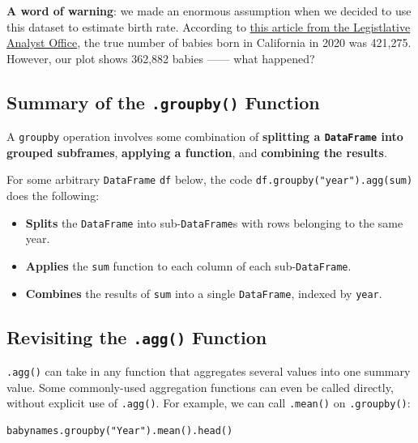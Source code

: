 \documentclass[
  letterpaper,
  DIV=11,
  numbers=noendperiod]{scrreprt}
\providecommand{\tightlist}{%
  \setlength{\itemsep}{0pt}\setlength{\parskip}{0pt}}\usepackage{longtable,booktabs,array}
\begin{document}
\textbf{A word of warning}: we made an enormous assumption when we
decided to use this dataset to estimate birth rate. According to
\href{https://lao.ca.gov/LAOEconTax/Article/Detail/691}{this article
from the Legistlative Analyst Office}, the true number of babies born in
California in 2020 was 421,275. However, our plot shows 362,882 babies
------ what happened?

\subsection{\texorpdfstring{Summary of the \texttt{.groupby()}
Function}{Summary of the .groupby() Function}}\label{summary-of-the-.groupby-function}

A \texttt{groupby} operation involves some combination of
\textbf{splitting a \texttt{DataFrame} into grouped subframes},
\textbf{applying a function}, and \textbf{combining the results}.

For some arbitrary \texttt{DataFrame} \texttt{df} below, the code
\texttt{df.groupby("year").agg(sum)} does the following:

\begin{itemize}
\tightlist
\item
  \textbf{Splits} the \texttt{DataFrame} into sub-\texttt{DataFrame}s
  with rows belonging to the same year.
\item
  \textbf{Applies} the \texttt{sum} function to each column of each
  sub-\texttt{DataFrame}.
\item
  \textbf{Combines} the results of \texttt{sum} into a single
  \texttt{DataFrame}, indexed by \texttt{year}.
\end{itemize}

\subsection{\texorpdfstring{Revisiting the \texttt{.agg()}
Function}{Revisiting the .agg() Function}}\label{revisiting-the-.agg-function}

\texttt{.agg()} can take in any function that aggregates several values
into one summary value. Some commonly-used aggregation functions can
even be called directly, without explicit use of \texttt{.agg()}. For
example, we can call \texttt{.mean()} on \texttt{.groupby()}:

\begin{verbatim}
babynames.groupby("Year").mean().head()
\end{verbatim}
\end{document}
